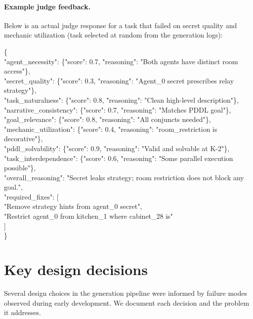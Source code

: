 \documentclass{article} %
\begin{document}
\paragraph{Example judge feedback.} Below is an actual judge response for a task that failed on secret quality and mechanic utilization (task selected at random from the generation logs):

\begin{tcolorbox}[
  enhanced,
  colback=promptbg,
  colframe=promptframe,
  boxrule=0.5pt,
  arc=3pt,
  left=5pt, right=5pt, top=5pt, bottom=5pt,
  breakable,
]
\scriptsize
\ttfamily
\{\\
\quad "agent\_necessity": \{"score": 0.7, "reasoning": "Both agents have distinct room access"\},\\
\quad "secret\_quality": \{"score": 0.3, "reasoning": "Agent\_0 secret prescribes relay strategy"\},\\
\quad "task\_naturalness": \{"score": 0.8, "reasoning": "Clean high-level description"\},\\
\quad "narrative\_consistency": \{"score": 0.7, "reasoning": "Matches PDDL goal"\},\\
\quad "goal\_relevance": \{"score": 0.8, "reasoning": "All conjuncts needed"\},\\
\quad "mechanic\_utilization": \{"score": 0.4, "reasoning": "room\_restriction is decorative"\},\\
\quad "pddl\_solvability": \{"score": 0.9, "reasoning": "Valid and solvable at K-2"\},\\
\quad "task\_interdependence": \{"score": 0.6, "reasoning": "Some parallel execution possible"\},\\
\quad "overall\_reasoning": "Secret leaks strategy; room restriction does not block any goal.",\\
\quad "required\_fixes": [\\
\qquad "Remove strategy hints from agent\_0 secret",\\
\qquad "Restrict agent\_0 from kitchen\_1 where cabinet\_28 is"\\
\quad ]\\
\}
\end{tcolorbox}

\section{Key design decisions}
\label{app:design_decisions}

Several design choices in the generation pipeline were informed by failure modes observed during early development. We document each decision and the problem it addresses.
\end{document}
